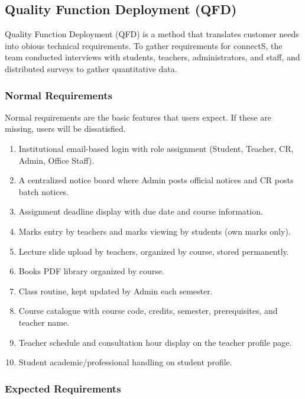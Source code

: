 \documentclass[12pt,a4paper]{article}
\begin{document}
\subsection{Quality Function Deployment (QFD)}

Quality Function Deployment (QFD) is a method that translates customer needs into obious technical requirements. To gather requirements for connectS, the team conducted interviews with students, teachers, administrators, and staff, and distributed surveys to gather quantitative data.

\subsubsection{Normal Requirements}

Normal requirements are the basic features that users expect. If these are missing, users will be dissatisfied.

\begin{enumerate}[leftmargin=*, label=\textbf{\arabic*.}, itemsep=3pt]
  \item Institutional email-based login with role assignment (Student, Teacher, CR, Admin, Office Staff).
  \item A centralized notice board where Admin posts official notices and CR posts batch notices.
  \item Assignment deadline display with due date and course information.
  \item Marks entry by teachers and marks viewing by students (own marks only).
  \item Lecture slide upload by teachers, organized by course, stored permanently.
  \item Books PDF library organized by course.
  \item Class routine, kept updated by Admin each semester.
  \item Course catalogue with course code, credits, semester, prerequisites, and teacher name.
  \item Teacher schedule and consultation hour display on the teacher profile page.
  \item Student academic/professional handling on student profile.
\end{enumerate}

\subsubsection{Expected Requirements}
\end{document}
